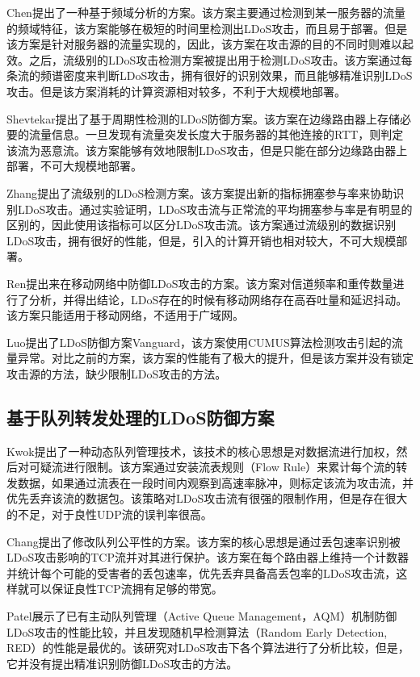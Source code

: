 Chen\cite{b3}提出了一种基于频域分析的方案。该方案主要通过检测到某一服务器的流量的频域特征，该方案能够在极短的时间里检测出LDoS攻击，而且易于部署。但是该方案是针对服务器的流量实现的，因此，该方案在攻击源的目的不同时则难以起效。之后，流级别的LDoS攻击检测方案\cite{chen2007spectral}被提出用于检测LDoS攻击。该方案通过每条流的频谱密度来判断LDoS攻击，拥有很好的识别效果，而且能够精准识别LDoS攻击。但是该方案消耗的计算资源相对较多，不利于大规模地部署。

Shevtekar\cite{shevtekar2005low}提出了基于周期性检测的LDoS防御方案。该方案在边缘路由器上存储必要的流量信息。一旦发现有流量突发长度大于服务器的其他连接的RTT，则判定该流为恶意流。该方案能够有效地限制LDoS攻击，但是只能在部分边缘路由器上部署，不可大规模地部署。

Zhang\cite{b1}提出了流级别的LDoS检测方案。该方案提出新的指标拥塞参与率来协助识别LDoS攻击。通过实验证明，LDoS攻击流与正常流的平均拥塞参与率是有明显的区别的，因此使用该指标可以区分LDoS攻击流。该方案通过流级别的数据识别LDoS攻击，拥有很好的性能，但是，引入的计算开销也相对较大，不可大规模部署。

Ren\cite{ren2007pulsing}提出来在移动网络中防御LDoS攻击的方案。该方案对信道频率和重传数量进行了分析，并得出结论，LDoS存在的时候有移动网络存在高吞吐量和延迟抖动。该方案只能适用于移动网络，不适用于广域网。

Luo\cite{luo2009detecting}提出了LDoS防御方案Vanguard，该方案使用CUMUS算法检测攻击引起的流量异常。对比之前的方案，该方案的性能有了极大的提升，但是该方案并没有锁定攻击源的方法，缺少限制LDoS攻击的方法。

\subsection{基于队列转发处理的LDoS防御方案}
\label{chap2:queanalysis}
Kwok\cite{b22}提出了一种动态队列管理技术，该技术的核心思想是对数据流进行加权，然后对可疑流进行限制。该方案通过安装流表规则（Flow Rule）来累计每个流的转发数据，如果通过流表在一段时间内观察到高速率脉冲，则标定该流为攻击流，并优先丢弃该流的数据包。该策略对LDoS攻击流有很强的限制作用，但是存在很大的不足，对于良性UDP流的误判率很高。

Chang\cite{b8}提出了修改队列公平性的方案。该方案的核心思想是通过丢包速率识别被LDoS攻击影响的TCP流并对其进行保护。该方案在每个路由器上维持一个计数器并统计每个可能的受害者的丢包速率，优先丢弃具备高丢包率的LDoS攻击流，这样就可以保证良性TCP流拥有足够的带宽。

Patel\cite{patel2016throughput}展示了已有主动队列管理（Active Queue Management，AQM）机制防御LDoS攻击的性能比较，并且发现随机早检测算法（Random Early Detection, RED）的性能是最优的。该研究对LDoS攻击下各个算法进行了分析比较，但是，它并没有提出精准识别防御LDoS攻击的方法。



